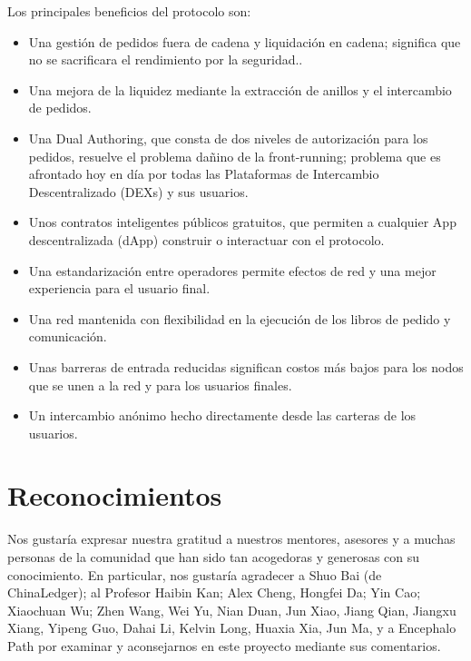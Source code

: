 \documentclass[UTF8,nofonts]{article}
\begin{document}
\begin{multicols}{2}
Los principales beneficios del protocolo son:
\begin{itemize}
	\item Una gesti\'on de pedidos fuera de cadena y liquidaci\'on en cadena; significa que no se sacrificara el rendimiento por la seguridad..
	\item Una mejora de la liquidez mediante la extracci\'on de anillos y el intercambio de pedidos.
	\item Una Dual Authoring, que consta de dos niveles de autorizaci\'on para los pedidos, resuelve el problema da\~nino de la front-running; problema que es afrontado hoy en d\'ia por todas las Plataformas de Intercambio Descentralizado (DEXs) y sus usuarios.
	\item Unos contratos inteligentes p\'ublicos gratuitos, que permiten a cualquier App descentralizada (dApp) construir o interactuar con el protocolo.
	\item Una estandarizaci\'on entre operadores permite efectos de red y una mejor experiencia para el usuario final.
	\item Una red mantenida con flexibilidad en la ejecuci\'on de los libros de pedido y comunicaci\'on.
	\item Unas barreras de entrada reducidas significan costos m\'as bajos para los nodos que se unen a la red y para los usuarios finales.
	\item Un intercambio an\'onimo hecho directamente desde las carteras de los usuarios.	
\end{itemize}


\section{Reconocimientos}
Nos gustar\'ia expresar nuestra gratitud a nuestros mentores, asesores y a muchas personas de la comunidad que han sido tan acogedoras y generosas con su conocimiento. En particular, nos gustar\'ia agradecer a Shuo Bai (de ChinaLedger); al Profesor Haibin Kan; Alex Cheng, Hongfei Da; Yin Cao; Xiaochuan Wu; Zhen Wang, Wei Yu, Nian Duan, Jun Xiao, Jiang Qian, Jiangxu Xiang, Yipeng Guo, Dahai Li, Kelvin Long, Huaxia Xia, Jun Ma, y a Encephalo Path por examinar y aconsejarnos en este proyecto mediante sus comentarios.





\end{multicols}
\end{document}
